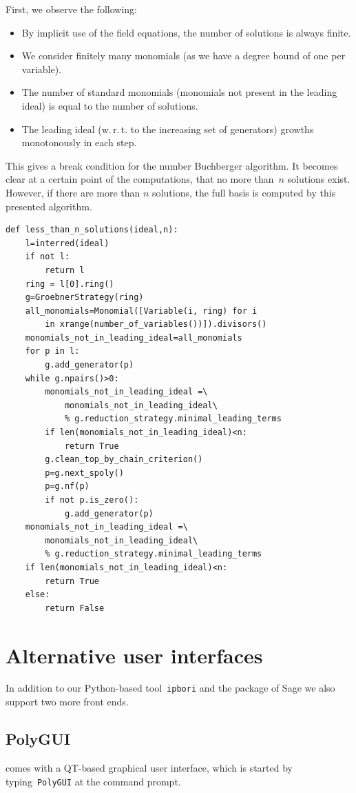 First, we observe the following:
\begin{itemize}
    \item By implicit use of the field equations, the number of solutions is always finite.
    \item We consider finitely many monomials (as we have a degree bound of one per variable).
    \item The number of standard monomials (monomials not present in the leading ideal) is equal to the number of solutions.
    \item The leading ideal (w.\,r.\,t. to the increasing set of generators) growths monotonously in each step.
\end{itemize}
This gives a break condition for the number Buchberger algorithm. It becomes
clear at a certain point of the computations,  that no more than~$n$ solutions exist.
However, if there are more than $n$ solutions, the full \Groebner basis is computed by this presented algorithm.
\begin{lstlisting}
def less_than_n_solutions(ideal,n):
    l=interred(ideal)
    if not l:
        return l
    ring = l[0].ring()
    g=GroebnerStrategy(ring)
    all_monomials=Monomial([Variable(i, ring) for i 
        in xrange(number_of_variables())]).divisors()
    monomials_not_in_leading_ideal=all_monomials
    for p in l:
        g.add_generator(p)
    while g.npairs()>0:
        monomials_not_in_leading_ideal =\
            monomials_not_in_leading_ideal\
            % g.reduction_strategy.minimal_leading_terms
        if len(monomials_not_in_leading_ideal)<n:
            return True
        g.clean_top_by_chain_criterion()
        p=g.next_spoly()
        p=g.nf(p)
        if not p.is_zero():
            g.add_generator(p)
    monomials_not_in_leading_ideal =\
        monomials_not_in_leading_ideal\
        % g.reduction_strategy.minimal_leading_terms
    if len(monomials_not_in_leading_ideal)<n:
        return True
    else:
        return False
\end{lstlisting}

\section{Alternative user interfaces}

In addition to our Python-based tool~\texttt{ipbori} and the \PolyBoRi
package of Sage  we also support two more front ends.

\subsection{PolyGUI}
\PolyBoRi comes with a QT-based  graphical user interface, which is started
by typing~\texttt{PolyGUI} at the command prompt.

